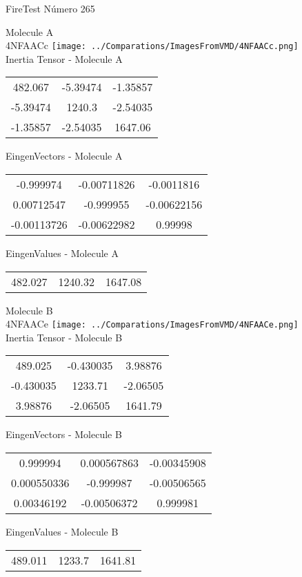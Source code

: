 \vtab[-2cm]
\begin{center}
{\large FireTest \tab Número 265}
\end{center}
\begin{multicols}{2}
\begin{center}

Molecule A \\ 
4NFAACc
\texttt{[image: ../Comparations/ImagesFromVMD/4NFAACc.png]}
\\
Inertia Tensor - Molecule A \\
\vtab

\begin{tabular}{|c c c|}
482.067	 & 	-5.39474	 & 	-1.35857	 \\
-5.39474	 & 	1240.3	 & 	-2.54035	 \\
-1.35857	 & 	-2.54035	 & 	1647.06
\end{tabular}

\vtab
 EingenVectors - Molecule A     \\
\vtab
\begin{tabular}{|c c c|}
-0.999974	 & 	-0.00711826	 & 	-0.0011816	 \\
0.00712547	 & 	-0.999955	 & 	-0.00622156	 \\
-0.00113726	 & 	-0.00622982	 & 	0.99998
\end{tabular}

\vtab
 EingenValues - Molecule A     \\
\vtab
\begin{tabular}{|c c c|}
482.027	 & 	1240.32	 & 	1647.08	 \\
\end{tabular}
\columnbreak

Molecule B \\ 
4NFAACe
\texttt{[image: ../Comparations/ImagesFromVMD/4NFAACe.png]}
\\
Inertia Tensor - Molecule B \\
\vtab

\begin{tabular}{|c c c|}
489.025	 & 	-0.430035	 & 	3.98876	 \\
-0.430035	 & 	1233.71	 & 	-2.06505	 \\
3.98876	 & 	-2.06505	 & 	1641.79
\end{tabular}

\vtab
 EingenVectors - Molecule B     \\
\vtab
\begin{tabular}{|c c c|}
0.999994	 & 	0.000567863	 & 	-0.00345908	 \\
0.000550336	 & 	-0.999987	 & 	-0.00506565	 \\
0.00346192	 & 	-0.00506372	 & 	0.999981
\end{tabular}

\vtab
 EingenValues - Molecule B     \\
\vtab
\begin{tabular}{|c c c|}
489.011	 & 	1233.7	 & 	1641.81	 \\
\end{tabular}

\end{center}
\end{multicols}

